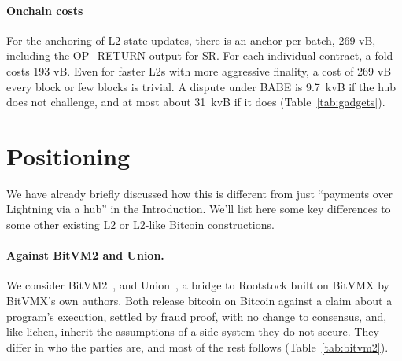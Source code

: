 \documentclass[11pt]{article}
\begin{document}
\paragraph{Onchain costs} For the anchoring of L2 state updates, there is an anchor per batch, 269 vB, including the OP\_RETURN output for SR. For each individual contract, a fold costs 193 vB. Even for faster L2s with more aggressive finality, a cost of 269 vB every block or few blocks is trivial. A dispute under BABE is 9.7~kvB if the hub does not challenge, and at most about 31~kvB if it does (Table~\ref{tab:gadgets}).

\section{Positioning}
\label{sec:positioning}

We have already briefly discussed how this is different from just ``payments over Lightning via a hub'' in the Introduction. We'll list here some key differences to some other existing L2 or L2-like Bitcoin constructions.

\paragraph{Against BitVM2 and Union.} We consider BitVM2~\cite{bitvm2usenix}, and
Union~\cite{union}, a bridge to Rootstock built on BitVMX by BitVMX's
own authors. Both release bitcoin on Bitcoin against a claim about
a program's execution, settled by fraud proof, with no change to
consensus, and, like lichen, inherit the assumptions of a side system they
do not secure. They differ in who the parties are, and most of the rest
follows (Table~\ref{tab:bitvm2}).
\end{document}
